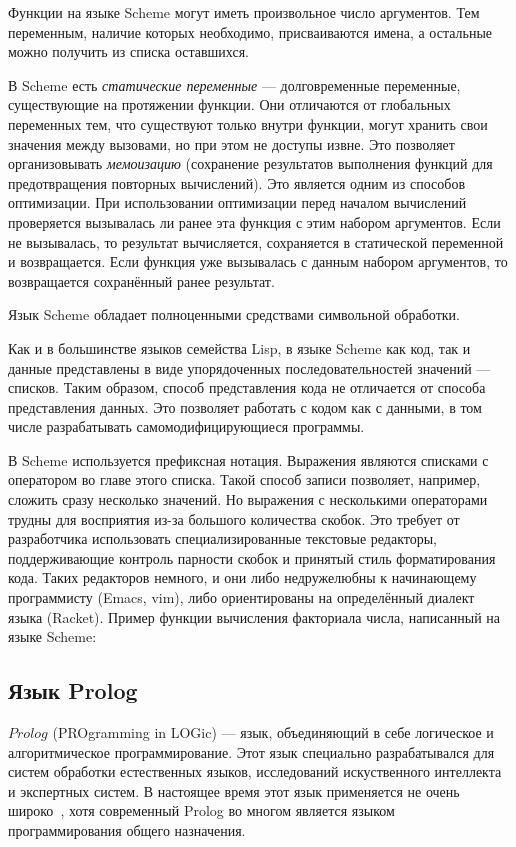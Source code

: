         Функции на языке Scheme могут иметь произвольное число аргументов.
        Тем переменным, наличие которых необходимо, присваиваются имена, а остальные можно получить из списка оставшихся.

        В Scheme есть \textit{статические переменные} --- долговременные переменные, существующие на протяжении функции.
        Они отличаются от глобальных переменных тем, что существуют только внутри функции, могут хранить свои значения между вызовами, но при этом не доступы извне.
        Это позволяет организовывать \textit{мемоизацию} (сохранение результатов выполнения функций для предотвращения повторных вычислений).
        Это является одним из способов оптимизации.
        При использовании оптимизации перед началом вычислений проверяется вызывалась ли ранее эта функция с этим набором аргументов.
        Если не вызывалась, то результат вычисляется, сохраняется в статической переменной и возвращается.
        Если функция уже вызывалась с данным набором аргументов, то возвращается сохранённый ранее результат.
        
        Язык Scheme обладает полноценными средствами символьной обработки.

        Как и в большинстве языков семейства Lisp, в языке Scheme как код, так и данные представлены в виде упорядоченных последовательностей значений --- списков.
        Таким образом, способ представления кода не отличается от способа представления данных.
        Это позволяет работать с кодом как с данными, в том числе разрабатывать самомодифицирующиеся программы.
        
        В Scheme используется префиксная нотация.
        Выражения являются списками с оператором во главе этого списка.
        Такой способ записи позволяет, например, сложить сразу несколько значений.
        Но выражения с несколькими операторами трудны для восприятия из-за большого количества скобок.
        Это требует от разработчика использовать специализированные текстовые редакторы, поддерживающие контроль парности скобок и принятый стиль форматирования кода.
        Таких редакторов немного, и они либо недружелюбны к начинающему программисту (Emacs, vim), либо ориентированы на определённый диалект языка (Racket).
        \clearpage
        Пример функции вычисления факториала числа, написанный на языке Scheme:

        

    \subsection{Язык Prolog}
        $Prolog$ (PROgramming in LOGic) --- язык, объединяющий в себе логическое и алгоритмическое программирование.
        Этот язык специально разрабатывался для систем обработки естественных языков, исследований искуственного интеллекта и экспертных систем.
        В настоящее время этот язык применяется не очень широко~\cite{TIOBE}, хотя современный Prolog во многом является языком программирования общего назначения.

